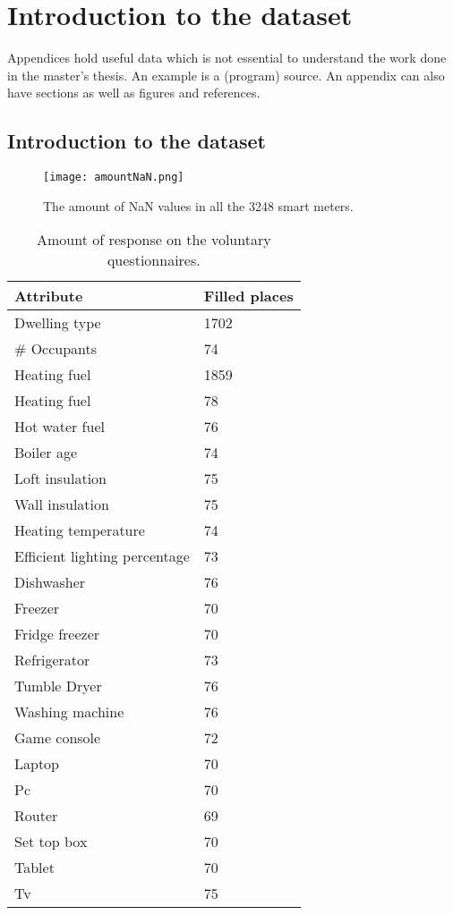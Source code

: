 \chapter{Introduction to the dataset}
\label{app:A}
Appendices hold useful data which is not essential to understand the work
done in the master's thesis. An example is a (program) source.
An appendix can also have sections as well as figures and references\cite{h2g2}.

\section{Introduction to the dataset}

\begin{figure}[h!]
	\centering
	\texttt{[image: amountNaN.png]}
	\caption{The amount of NaN values in all the 3248 smart meters.}
	\label{fig:amountNaN}
\end{figure}

\begin{table}[h]
	\centering
	\begin{tabular}{|p{5cm}|p{2.5cm}|}
		\hline
		\textbf{Attribute} & \textbf{Filled places}\\ \hline	
		Dwelling type  & 1702\\ \hline
		\# Occupants & 74\\ \hline
		Heating fuel & 1859\\ \hline
		Heating fuel & 78\\ \hline
		Hot water fuel & 76\\ \hline
		Boiler age & 74\\ \hline
		Loft insulation & 75\\ \hline
		Wall insulation & 75\\ \hline
		Heating temperature & 74\\ \hline
		Efficient lighting percentage & 73\\ \hline
		Dishwasher & 76\\ \hline
		Freezer & 70\\ \hline
		Fridge freezer & 70\\ \hline
		Refrigerator & 73\\ \hline
		Tumble Dryer & 76\\ \hline
		Washing machine & 76\\ \hline
		Game console &72\\ \hline
		Laptop & 70\\ \hline
		Pc & 70\\ \hline
		Router & 69\\ \hline
		Set top box & 70\\ \hline
		Tablet & 70\\ \hline
		Tv & 75\\ \hline
		
	\end{tabular}
	\caption{Amount of response on the voluntary questionnaires. }
	\label{tab:attributes}
\end{table}

